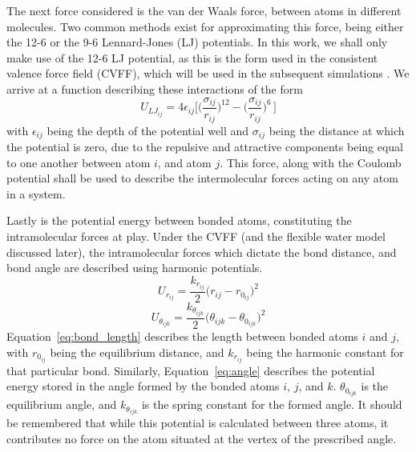 			The next force considered is the van der Waals force, between atoms in different molecules. Two common methods exist for approximating this force, being either the 12-6 or the 9-6 Lennard-Jones (LJ) potentials. In this work, we shall only make use of the 12-6 LJ potential, as this is the form used in the consistent valence force field (CVFF), which will be used in the subsequent simulations \cite{heinz2005force}. We arrive at a function describing these interactions of the form
			\begin{equation}
				U_{LJ_{ij}} = 4\epsilon_{ij}\bigg[ \bigg(\frac{\sigma_{ij}}{r_{ij}}\bigg)^{12} - \bigg(\frac{\sigma_{ij}}{r_{ij}}\bigg)^6\,\bigg]
				\label{eq:lj}
			\end{equation}
			with $\epsilon_{ij}$ being the depth of the potential well and $\sigma_{ij}$ being the distance at which the potential is zero, due to the repulsive and attractive components being equal to one another between atom $i$, and atom $j$. This force, along with the Coulomb potential shall be used to describe the intermolecular forces acting on any atom in a system.
			
			Lastly is the potential energy between bonded atoms, constituting the intramolecular forces at play. Under the CVFF (and the flexible water model discussed later), the intramolecular forces which dictate the bond distance, and bond angle are described using harmonic potentials.
			\begin{equation}
				U_{r_{ij}} = \frac{k_{r_{ij}}}{2}\big( r_{ij} - r_{0_{ij}} \big)^2
				\label{eq:bond_length}
			\end{equation}
			\begin{equation}
				U_{\theta_{ijk}} = \frac{k_{\theta_{ijk}}}{2}\big( \theta_{ijk} - \theta_{0_{ijk}} \big)^2
				\label{eq:angle}
			\end{equation}
			Equation~\ref{eq:bond_length} describes the length between bonded atoms $i$ and $j$, with $r_{0_{ij}}$ being the equilibrium distance, and $k_{r_{ij}}$ being the harmonic constant for that particular bond. Similarly, Equation~\ref{eq:angle} describes the potential energy stored in the angle formed by the bonded atoms $i$, $j$, and $k$. $\theta_{0_{ijk}}$ is the equilibrium angle, and $k_{\theta_{ijk}}$ is the spring constant for the formed angle. It should be remembered that while this potential is calculated between three atoms, it contributes no force on the atom situated at the vertex of the prescribed angle.
			
